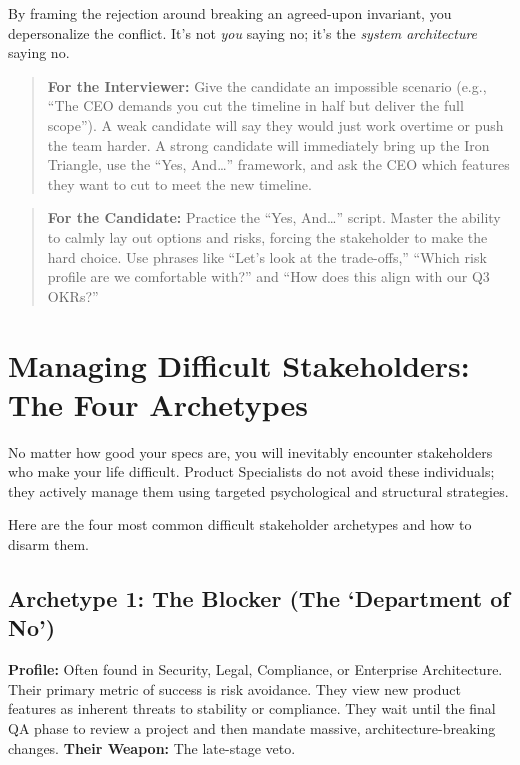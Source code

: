 By framing the rejection around breaking an agreed-upon invariant, you
depersonalize the conflict. It's not \emph{you} saying no; it's the
\emph{system architecture} saying no.

\begin{quote}
\textbf{For the Interviewer:} Give the candidate an impossible scenario
(e.g., ``The CEO demands you cut the timeline in half but deliver the
full scope''). A weak candidate will say they would just work overtime
or push the team harder. A strong candidate will immediately bring up
the Iron Triangle, use the ``Yes, And\ldots{}'' framework, and ask the
CEO which features they want to cut to meet the new timeline.
\end{quote}

\begin{quote}
\textbf{For the Candidate:} Practice the ``Yes, And\ldots{}'' script.
Master the ability to calmly lay out options and risks, forcing the
stakeholder to make the hard choice. Use phrases like ``Let's look at
the trade-offs,'' ``Which risk profile are we comfortable with?'' and
``How does this align with our Q3 OKRs?''
\end{quote}

\bigskip

\section{Managing Difficult Stakeholders: The Four
Archetypes}\label{managing-difficult-stakeholders-the-four-archetypes}

No matter how good your specs are, you will inevitably encounter
stakeholders who make your life difficult. Product Specialists do not
avoid these individuals; they actively manage them using targeted
psychological and structural strategies.

Here are the four most common difficult stakeholder archetypes and how
to disarm them.

\subsection{Archetype 1: The Blocker (The `Department of
No')}\label{archetype-1-the-blocker-the-department-of-no}

\textbf{Profile:} Often found in Security, Legal, Compliance, or
Enterprise Architecture. Their primary metric of success is risk
avoidance. They view new product features as inherent threats to
stability or compliance. They wait until the final QA phase to review a
project and then mandate massive, architecture-breaking changes.
\textbf{Their Weapon:} The late-stage veto.

